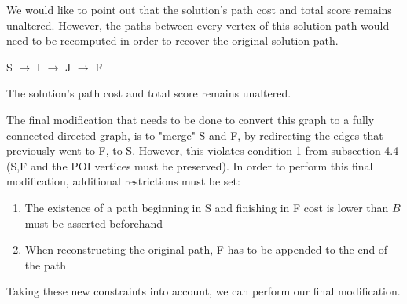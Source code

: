 \documentclass{article}
\begin{document}
We would like to point out that the solution's path cost and total score remains unaltered. However, the paths between every vertex of this solution path would need to be recomputed in order to recover the original solution path.
\begin{center}

S $\rightarrow$ I $\rightarrow$ J $\rightarrow$ F

The solution's path cost and total score remains unaltered.
\end{center}

The final modification that needs to be done to convert this graph to a fully connected directed graph, is to "merge" S and F, by redirecting the edges that previously went to F, to S. However, this violates condition 1 from subsection 4.4 (S,F and the POI vertices must be preserved). In order to perform this final modification, additional restrictions must be set:
\begin{enumerate}
    \item The existence of a path beginning in S and finishing in F cost is lower than $B$ must be asserted beforehand
    \item When reconstructing the original path, F has to be appended to the end of the path
\end{enumerate}

Taking these new constraints into account, we can perform our final modification.
\end{document}
